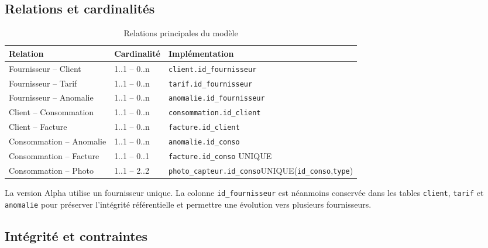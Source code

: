 \subsection{Relations et cardinalités}

\begin{table}[H]
\centering
\caption{Relations principales du modèle}
\label{tab:relations}
\small
\begin{tabular}{p{}p{}p{}}
\toprule
\textbf{Relation} & \textbf{Cardinalité} & \textbf{Implémentation} \\
\midrule
Fournisseur -- Client & 1..1 -- 0..n & \texttt{client.id\_fournisseur} \\
Fournisseur -- Tarif & 1..1 -- 0..n & \texttt{tarif.id\_fournisseur} \\
Fournisseur -- Anomalie & 1..1 -- 0..n & \texttt{anomalie.id\_fournisseur} \\
Client -- Consommation & 1..1 -- 0..n & \texttt{consommation.id\_client} \\
Client -- Facture & 1..1 -- 0..n & \texttt{facture.id\_client} \\
Consommation -- Anomalie & 1..1 -- 0..n & \texttt{anomalie.id\_conso} \\
Consommation -- Facture & 1..1 -- 0..1 & \texttt{facture.id\_conso} UNIQUE \\
Consommation -- Photo & 1..1 -- 2..2 & \texttt{photo\_capteur.id\_conso}\newline UNIQUE(\texttt{id\_conso},\texttt{type}) \\
\bottomrule
\end{tabular}
\end{table}

La version Alpha utilise un fournisseur unique. La colonne \texttt{id\_fournisseur} est néanmoins conservée dans les tables \texttt{client}, \texttt{tarif} et \texttt{anomalie} pour préserver l'intégrité référentielle et permettre une évolution vers plusieurs fournisseurs.

\subsection{Intégrité et contraintes}

